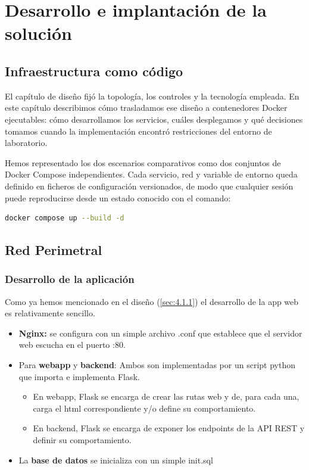 \documentclass[11pt,spanish,listoffigures,listoftables]{tfgetsinf}
\begin{document}


\chapter{Desarrollo e implantación de la solución}
    
    \section{Infraestructura como código}
    El capítulo de diseño fijó la topología, los controles y la tecnología empleada. En este capítulo describimos cómo trasladamos ese diseño a contenedores Docker ejecutables: cómo desarrollamos los servicios, cuáles desplegamos y qué decisiones tomamos cuando la implementación encontró restricciones del entorno de laboratorio.
    
    Hemos representado los dos escenarios comparativos como dos conjuntos de Docker Compose independientes. Cada servicio, red y variable de entorno queda definido en ficheros de configuración versionados, de modo que cualquier sesión puede reproducirse desde un estado conocido con el comando:
    
    \begin{lstlisting}[language=Bash, aboveskip=10pt, belowskip=10pt]
docker compose up --build -d
    \end{lstlisting}
    
    \section{Red Perimetral}
    
        \subsection{Desarrollo de la aplicación}
        Como ya hemos mencionado en el diseño (\cref{sec:4.1.1}) el desarrollo de la app web es relativamente sencillo.
        \begin{itemize}
            \item \textbf{Nginx:} se configura con un simple archivo .conf que establece que el servidor web escucha en el puerto :80.
            \item Para \textbf{webapp} y \textbf{backend}: Ambos son implementadas por un script python que importa e implementa Flask.
            \begin{itemize}
                \item En webapp, Flask se encarga de crear las rutas web y de, para cada una, carga el html correspondiente y/o define su comportamiento.
                \item En backend, Flask se encarga de exponer los endpoints de la API REST y definir su comportamiento.
            \end{itemize}
            \item La \textbf{base de datos} se inicializa con un simple init.sql
        \end{itemize}
        
\end{document}
